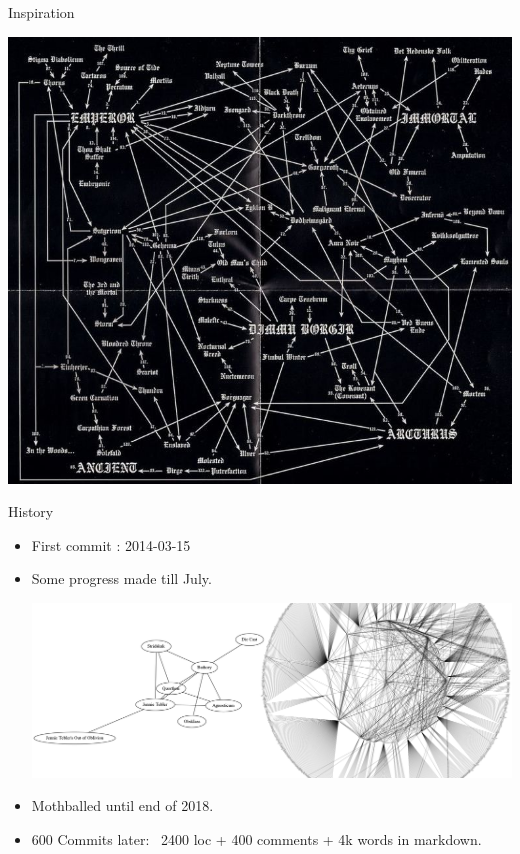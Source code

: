 \documentclass{beamer}
\begin{document}
    \begin{frame}{Inspiration}
      \begin{center}
        \includegraphics[scale=2.3]{true_kings_diagram}
      \end{center}
    \end{frame}

    \begin{frame}{History}

      \begin{itemize}

        \item<1-> First commit : 2014-03-15
        \item<1-> Some progress made till July.
          \begin{center}
            \includegraphics[scale=.6]{bandsGraphCombined}
          \end{center}
        \item<2-> Mothballed until end of 2018.
        \item<2-> 600 Commits later: ~2400 loc + 400 comments + 4k words in
          markdown.
      \end{itemize}

    \end{frame}
\end{document}
